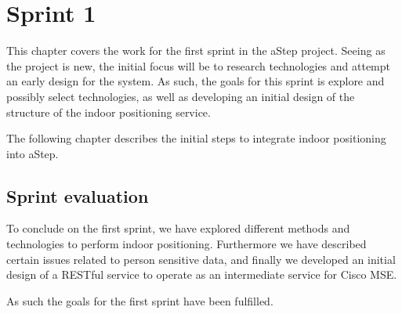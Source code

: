 \chapter{Sprint 1}
This chapter covers the work for the first sprint in the aStep project. Seeing as the project is new, the initial focus will be to research technologies and attempt an early design for the system. As such, the goals for this sprint is explore and possibly select technologies, as well as developing an initial design of the structure of the indoor positioning service. 

The following chapter describes the initial steps to integrate indoor positioning into aStep.






\section{Sprint evaluation}
To conclude on the first sprint, we have explored different methods and technologies to perform indoor positioning. Furthermore we have described certain issues related to person sensitive data, and finally we developed an initial design of a RESTful service to operate as an intermediate service for Cisco MSE. 

As such the goals for the first sprint have been fulfilled.